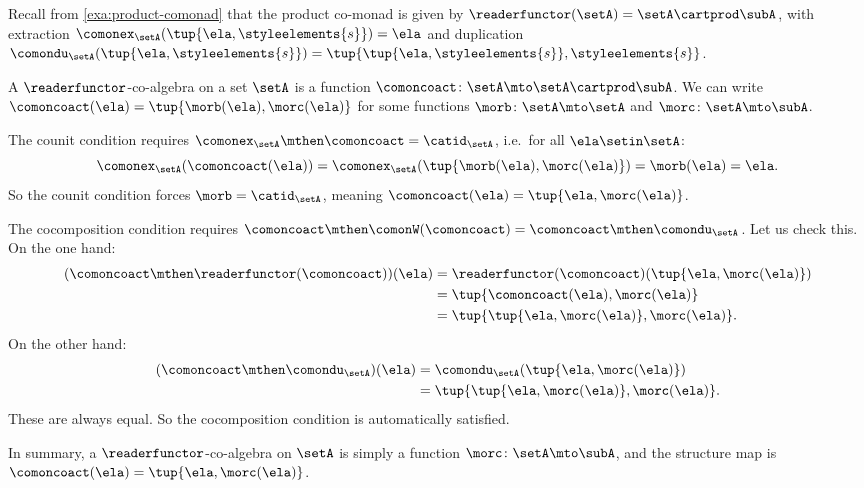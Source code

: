 \begin{example}
\label{exa:coalgebra-product-comonad}

Recall from \cref{exa:product-comonad} that the product co-monad is given by $\readerfunctor(\setA) = \setA \cartprod \subA$, with extraction $\comonex_\setA(\tup{\ela, \styleelements{s}}) = \ela$ and duplication $\comondu_\setA(\tup{\ela, \styleelements{s}}) = \tup{\tup{\ela, \styleelements{s}}, \styleelements{s}}$.

A $\readerfunctor$-co-algebra on a set $\setA$ is a function $\comoncoact \colon \setA \mto \setA \cartprod \subA$. We can write $\comoncoact(\ela) = \tup{\morb(\ela), \morc(\ela)}$ for some functions $\morb \colon \setA \mto \setA$ and $\morc \colon \setA \mto \subA$.

The counit condition requires $\comonex_\setA \mthen \comoncoact = \catid_\setA$, i.e.\ for all $\ela \setin \setA$:
\begin{equation*}
    \comonex_\setA(\comoncoact(\ela)) = \comonex_\setA(\tup{\morb(\ela), \morc(\ela)}) = \morb(\ela) = \ela.
\end{equation*}
So the counit condition forces $\morb = \catid_\setA$, meaning $\comoncoact(\ela) = \tup{\ela, \morc(\ela)}$.

The cocomposition condition requires $\comoncoact \mthen \comonW(\comoncoact) = \comoncoact \mthen \comondu_\setA$. Let us check this. On the one hand:
\begin{align*}
(\comoncoact \mthen \readerfunctor(\comoncoact))(\ela)
& = \readerfunctor(\comoncoact)(\tup{\ela, \morc(\ela)}) \\
& = \tup{\comoncoact(\ela), \morc(\ela)} \\
& = \tup{\tup{\ela, \morc(\ela)}, \morc(\ela)}.
\end{align*}
On the other hand:
\begin{align*}
(\comoncoact \mthen \comondu_\setA)(\ela)
& = \comondu_\setA(\tup{\ela, \morc(\ela)}) \\
& = \tup{\tup{\ela, \morc(\ela)}, \morc(\ela)}.
\end{align*}
These are always equal. So the cocomposition condition is automatically satisfied.

In summary, a $\readerfunctor$-co-algebra on $\setA$ is simply a function $\morc \colon \setA \mto \subA$, and the structure map is $\comoncoact(\ela) = \tup{\ela, \morc(\ela)}$.
\end{example}


